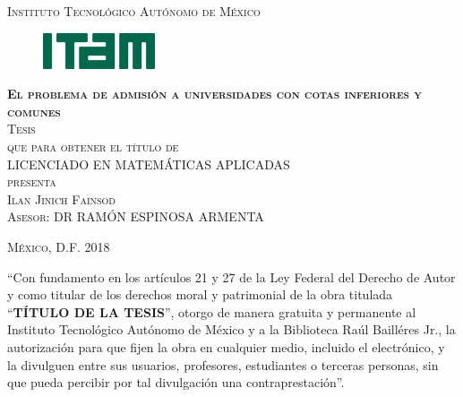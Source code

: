 \documentclass[11pt]{book}
\begin{document}
\begin{titlepage}
\begin{center}

\textsc{\Large Instituto Tecnológico Autónomo de México}\\[4em]

\begin{figure}[h]
\begin{center}
\includegraphics{logo-ITAM_ch.jpg}
\end{center}
\end{figure}

\vspace{4em}

\textsc{\huge \textbf{El problema de admisión a universidades con cotas inferiores y comunes}}\\[4em]

\textsc{\large Tesis}\\[1em]

\textsc{que para obtener el título de}\\[1em]

\textsc{LICENCIADO EN MATEMÁTICAS APLICADAS}\\[1em]

\textsc{presenta}\\[1em]

\textsc{\Large Ilan Jinich Fainsod}\\[1em]

\textsc{\large Asesor: DR RAMÓN ESPINOSA ARMENTA }

\end{center}

\vspace*{\fill}
\textsc{México, D.F. \hspace*{\fill} 2018}

\end{titlepage}



\thispagestyle{empty}
\vspace*{\fill}
\begingroup
``Con fundamento en los artículos 21 y 27 de la Ley Federal del Derecho de Autor y como titular de los derechos moral y patrimonial de la obra titulada ``\textbf{TÍTULO DE LA TESIS}'', otorgo de manera gratuita y permanente al Instituto Tecnológico Autónomo de México y a la Biblioteca Raúl Bailléres Jr., la autorización para que fijen la obra en cualquier medio, incluido el electrónico, y la divulguen entre sus usuarios, profesores, estudiantes o terceras personas, sin que pueda percibir por tal divulgación una contraprestación''.
\end{document}
